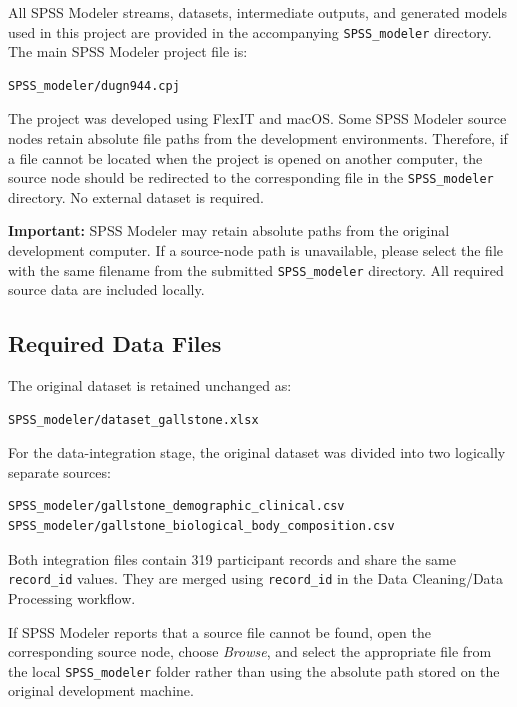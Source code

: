All SPSS Modeler streams, datasets, intermediate outputs, and generated
models used in this project are provided in the accompanying
\texttt{SPSS\_modeler} directory. The main SPSS Modeler project file is:

\begin{verbatim}
SPSS_modeler/dugn944.cpj
\end{verbatim}

The project was developed using FlexIT and macOS. Some SPSS Modeler source
nodes retain absolute file paths from the development environments. Therefore,
if a file cannot be located when the project is opened on another computer,
the source node should be redirected to the corresponding file in the
\texttt{SPSS\_modeler} directory. No external dataset is required.

\textbf{Important:} SPSS Modeler may retain absolute paths from the original
development computer. If a source-node path is unavailable, please select the
file with the same filename from the submitted \texttt{SPSS\_modeler}
directory. All required source data are included locally.

\subsection{Required Data Files}

The original dataset is retained unchanged as:

\begin{verbatim}
SPSS_modeler/dataset_gallstone.xlsx
\end{verbatim}

For the data-integration stage, the original dataset was divided into two
logically separate sources:

\begin{verbatim}
SPSS_modeler/gallstone_demographic_clinical.csv
SPSS_modeler/gallstone_biological_body_composition.csv
\end{verbatim}

Both integration files contain 319 participant records and share the same
\texttt{record\_id} values. They are merged using \texttt{record\_id} in the
Data Cleaning/Data Processing workflow.

If SPSS Modeler reports that a source file cannot be found, open the
corresponding source node, choose \textit{Browse}, and select the appropriate
file from the local \texttt{SPSS\_modeler} folder rather than using the
absolute path stored on the original development machine.

